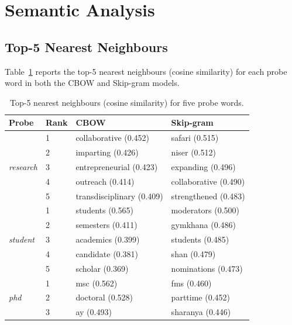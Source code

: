 \documentclass[12pt,a4paper]{article}
\begin{document}
\section{Semantic Analysis}

\subsection{Top-5 Nearest Neighbours}

Table~\ref{tab:nn} reports the top-5 nearest neighbours (cosine similarity)
for each probe word in both the CBOW and Skip-gram models.

\begin{table}[H]
    \centering
    \caption{Top-5 nearest neighbours (cosine similarity) for five probe words.}
    \label{tab:nn}
    \small
    \renewcommand{\arraystretch}{1.15}
    \begin{tabular}{ll p{4.8cm} p{4.8cm}}
        \toprule
        \textbf{Probe} & \textbf{Rank} & \textbf{CBOW} & \textbf{Skip-gram} \\
        \midrule
        \multirow{5}{*}{\textit{research}}
          & 1 & collaborative (0.452)   & safari (0.515)       \\
          & 2 & imparting (0.426)       & niser (0.512)        \\
          & 3 & entrepreneurial (0.423) & expanding (0.496)    \\
          & 4 & outreach (0.414)        & collaborative (0.490) \\
          & 5 & transdisciplinary (0.409) & strengthened (0.483) \\
        \midrule
        \multirow{5}{*}{\textit{student}}
          & 1 & students (0.565)  & moderators (0.500) \\
          & 2 & semesters (0.411) & gymkhana (0.486)   \\
          & 3 & academics (0.399) & students (0.485)   \\
          & 4 & candidate (0.381) & shan (0.479)       \\
          & 5 & scholar (0.369)   & nominations (0.473) \\
        \midrule
        \multirow{5}{*}{\textit{phd}}
          & 1 & msc (0.562)      & fms (0.460)       \\
          & 2 & doctoral (0.528) & parttime (0.452)  \\
          & 3 & ay (0.493)       & sharanya (0.446)  \\

\end{tabular}
\end{table}
\end{document}
